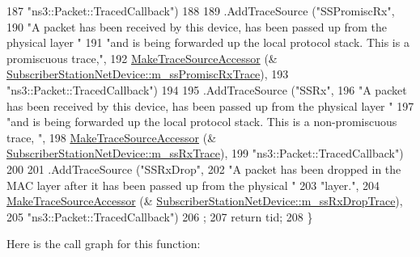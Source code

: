 \begin{DoxyCode}
187                      \textcolor{stringliteral}{"ns3::Packet::TracedCallback"})
188 
189     .AddTraceSource (\textcolor{stringliteral}{"SSPromiscRx"},
190                      \textcolor{stringliteral}{"A packet has been received by this device, has been passed up from the physical layer
       "}
191                      \textcolor{stringliteral}{"and is being forwarded up the local protocol stack.  This is a promiscuous trace,"},
192                      \hyperlink{group__tracing_gab21a770b9855af4e8f69f7531ea4a6b0}{MakeTraceSourceAccessor} (&
      \hyperlink{classns3_1_1SubscriberStationNetDevice_a2c670d0f51aa369b4e786c8112b2f7ea}{SubscriberStationNetDevice::m\_ssPromiscRxTrace}),
193                      \textcolor{stringliteral}{"ns3::Packet::TracedCallback"})
194 
195     .AddTraceSource (\textcolor{stringliteral}{"SSRx"},
196                      \textcolor{stringliteral}{"A packet has been received by this device, has been passed up from the physical layer
       "}
197                      \textcolor{stringliteral}{"and is being forwarded up the local protocol stack.  This is a non-promiscuous trace,
      "},
198                      \hyperlink{group__tracing_gab21a770b9855af4e8f69f7531ea4a6b0}{MakeTraceSourceAccessor} (&
      \hyperlink{classns3_1_1SubscriberStationNetDevice_a88c8f706dea73606f68daa73703f65b5}{SubscriberStationNetDevice::m\_ssRxTrace}),
199                      \textcolor{stringliteral}{"ns3::Packet::TracedCallback"})
200 
201     .AddTraceSource (\textcolor{stringliteral}{"SSRxDrop"},
202                      \textcolor{stringliteral}{"A packet has been dropped in the MAC layer after it has been passed up from the
       physical "}
203                      \textcolor{stringliteral}{"layer."},
204                      \hyperlink{group__tracing_gab21a770b9855af4e8f69f7531ea4a6b0}{MakeTraceSourceAccessor} (&
      \hyperlink{classns3_1_1SubscriberStationNetDevice_aa8ecbe05da5dcc544b94a2965cabdb9f}{SubscriberStationNetDevice::m\_ssRxDropTrace}),
205                      \textcolor{stringliteral}{"ns3::Packet::TracedCallback"})
206     ;
207   \textcolor{keywordflow}{return} tid;
208 \}
\end{DoxyCode}


Here is the call graph for this function\+:


